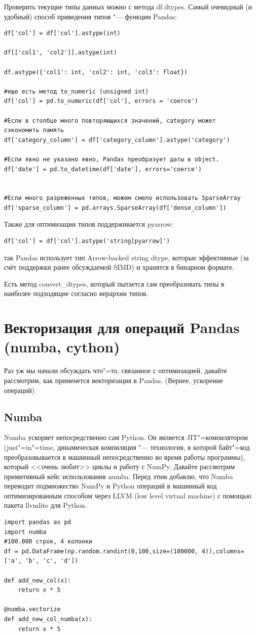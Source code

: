 \documentclass{article}
\begin{document}
Проверить текущие типы данных можно с метода df.dtypes.
Самый очевидный (и удобный) способ приведения типов "--- функции Pandas:
\begin{verbatim}
df['col'] = df['col'].astype(int)

df[['col1', 'col2']].astype(int)

df.astype({'col1': int, 'col2': int, 'col3': float})

#еще есть метод to_numeric (unsigned int)
df['col'] = pd.to_numeric(df['col'], errors = 'coerce')

#Если в столбце много повторяющихся значений, category может сэкономить память
df['category_column'] = df['category_column'].astype('category')

#Если явно не указано явно, Pandas преобразует даты в object.
df['date'] = pd.to_datetime(df['date'], errors='coerce')


#Если много разреженных типов, можем смело использовать SparseArray
df['sparse_column'] = pd.arrays.SparseArray(df['dense_column'])
\end{verbatim}

Также для оптимизации типов поддерживается pyarrow:
\begin{verbatim}
df['col'] = df['col'].astype('string[pyarrow]')
\end{verbatim}
так Pandas использует тип Arrow-backed string dtype, которые эффективные (за счёт поддержки ранее обсуждаемой SIMD) и хранятся в бинарном формате.

Есть метод convert\_dtypes, который пытается сам преобразовать типы в наиболее подходящие согласно иерархии типов.

\section*{Векторизация для операций Pandas (numba, cython)}
Раз уж мы начали обсуждать что"=то, связанное с оптимизацией, давайте рассмотрим, как применется векторизация в Pandas. (Вернее, ускорение операций)

\subsection*{Numba}
Numba ускоряет непосредственно сам Python. Он является JIT"=компилятором (just"=in"=time, динамическая компиляция "--- технология, в которой байт"=код преобразовывается в машинный непосредственно во время работы программы), который <<очень любит>> циклы и работу с NumPy. Давайте рассмотрим примитивный кейс использования numba. Перед этим добавлю, что Numba переводит подмножество NumPy и Python операций в машинный код оптимизированным способом через LLVM (low level virtual machine) с помощью пакета llvmlite для Python.
\begin{verbatim}
import pandas as pd
import numba
#100.000 строк, 4 колонки
df = pd.DataFrame(np.random.randint(0,100,size=(100000, 4)),columns=['a', 'b', 'c', 'd'])

def add_new_col(x):
    return x * 5

@numba.vectorize
def add_new_col_numba(x):
    return x * 5
\end{verbatim}
\end{document}
